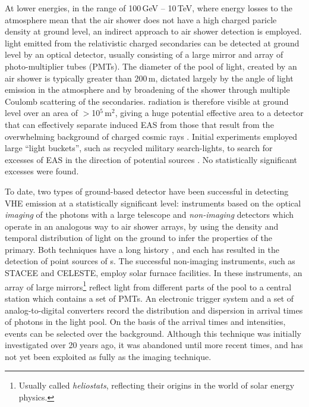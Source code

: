 At lower energies, in the range of 100\,GeV -- 10\,TeV, where energy
losses to the atmosphere mean that the air shower does not have a high
charged paricle density at ground level, an indirect approach to air
shower detection is employed. \Cerenkov light emitted from the
relativistic charged secondaries can be detected at ground level by an
optical detector, usually consisting of a large mirror and array of
photo-multiplier tubes (PMTs). The diameter of the pool of light,
created by an air shower is typically greater than $200$\,m, dictated
largely by the angle of \Cerenkov light emission in the atmosphere and
by broadening of the shower through multiple Coulomb scattering of the
secondaries. \Cerenkov radiation is therefore visible at ground level
over an area of $>$10$^5$\,m$^2$, giving a huge potential effective
area to a detector that can effectively separate \Gray induced EAS
from those that result from the overwhelming background of charged
cosmic rays \citep{REF::JELLEY_PORTER::QJRAS1963}. Initial experiments
employed large ``light buckets'', such as recycled military
search-lights, to search for excesses of EAS in the direction of
potential sources \citep[see previous reference
and][]{REF::CHUDAKOV::ICRC1963}.  No statistically significant
excesses were found.

To date, two types of ground-based \Cerenkov detector have been
successful in detecting VHE \Gray emission at a statistically
significant level: instruments based on the optical \textit{imaging}
of the \Cerenkov photons with a large telescope and
\textit{non-imaging} detectors which operate in an analogous way to
air shower arrays, by using the density and temporal distribution of 
\Cerenkov light on the ground to infer the properties of the primary. 
Both techniques have a long history 
\citep{REF::WEEKES_TURVER::RAGR1977,REF::DANAHER::SOLAR1982}, and each
has resulted in the detection of point sources of {\Grayc}s. The
successful non-imaging instruments, such as STACEE and CELESTE, employ
solar furnace facilities. In these instruments, an array of large
mirrors\footnote{Usually called \textit{heliostats}, reflecting their
origins in the world of solar energy physics.} reflect light from
different parts of the \Cerenkov pool to a central station which
contains a set of PMTs. An electronic trigger system and a set of
analog-to-digital converters record the distribution and dispersion in
arrival times of photons in the light pool. On the basis of the
arrival times and intensities, \Gray events can be selected over the
background. Although this technique was initially investigated over 20
years ago, it was abandoned until more recent times, and has not yet
been exploited as fully as the imaging technique.

